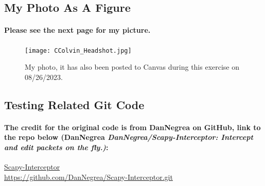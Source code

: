 \documentclass{article}
\begin{document}
\subsection{My Photo As A  Figure}
\paragraph{\quad Please see the next page for my picture.}
\begin{figure}[ht!]
\centering
\caption{\label{fig:CColvin_Headshot} My photo, it has also been posted to Canvas during this exercise on 08/26/2023.}
\texttt{[image: CColvin\_Headshot.jpg]}
\end{figure}
\clearpage
\subsection{Testing Related Git Code}
\paragraph{\quad The credit for the original code is from DanNegrea on GitHub, link to the repo below (DanNegrea \textit{DanNegrea/Scapy-Interceptor: Intercept and edit packets on the fly.)}:}
\hfill \break
\href{https://github.com/DanNegrea/Scapy-Interceptor.git}
{Scapy-Interceptor}
\\
\url{https://github.com/DanNegrea/Scapy-Interceptor.git}
\end{document}
